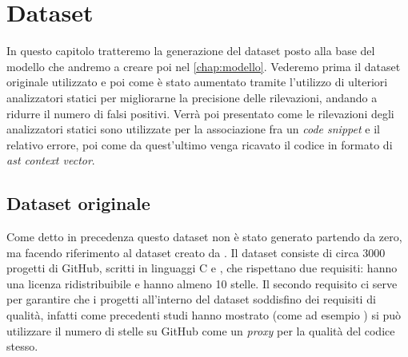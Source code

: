\chapter{Dataset}\label{chap:dataset}
In questo capitolo tratteremo la generazione del dataset posto alla base del modello che andremo a creare poi nel \autoref{chap:modello}. 
Vederemo prima il dataset originale utilizzato e poi come è stato aumentato tramite l'utilizzo di ulteriori analizzatori statici per migliorarne la precisione delle rilevazioni, andando a ridurre il numero di falsi positivi.
Verrà poi presentato come le rilevazioni degli analizzatori statici sono utilizzate per la associazione fra un \textit{code snippet} e il relativo errore, poi come da quest'ultimo venga ricavato il codice in formato di \textit{ast context vector}.

\section{Dataset originale}
Come detto in precedenza questo dataset non è stato generato partendo da zero, ma facendo riferimento al dataset creato da \cite{gelman2019source}. Il dataset consiste di circa 3000 progetti di GitHub, scritti in linguaggi C e \CPP,
 che rispettano due requisiti: hanno una licenza ridistribuibile e hanno almeno 10 stelle.
 Il secondo requisito ci serve per garantire che i progetti all'interno del dataset soddisfino dei requisiti di qualità, infatti come precedenti studi hanno mostrato (come ad esempio \cite{papamichail2016user}) si può utilizzare il numero
 di stelle su GitHub come un \textit{proxy} per la qualità del codice stesso.

